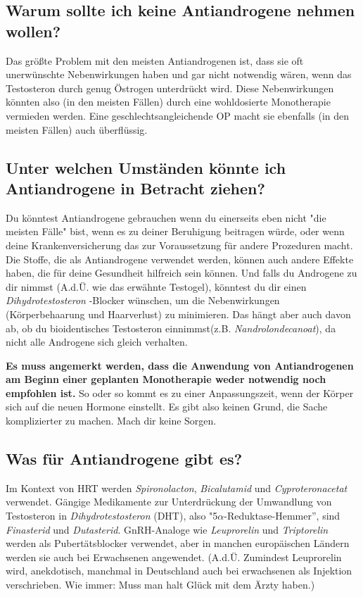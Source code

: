 \documentclass{article}
\begin{document}
\subsection{Warum sollte ich keine Antiandrogene nehmen wollen?}

Das größte Problem mit den meisten Antiandrogenen ist, dass sie oft unerwünschte Nebenwirkungen haben und gar nicht notwendig wären, wenn das Testosteron durch genug Östrogen unterdrückt wird. Diese Nebenwirkungen könnten also (in den meisten Fällen) durch eine wohldosierte Monotherapie vermieden werden. Eine geschlechtsangleichende OP macht sie ebenfalls (in den meisten Fällen) auch überflüssig.

\subsection{Unter welchen Umständen könnte ich Antiandrogene in Betracht ziehen?}

Du könntest Antiandrogene gebrauchen wenn du einerseits eben nicht "die meisten Fälle" bist, wenn es zu deiner Beruhigung beitragen würde, oder wenn deine Krankenversicherung das zur Voraussetzung für andere Prozeduren macht. Die Stoffe, die als Antiandrogene verwendet werden, können auch andere Effekte haben, die für deine Gesundheit hilfreich sein können. Und falls du Androgene zu dir nimmst (A.d.Ü. wie das erwähnte Testogel), könntest du dir einen \textit{Dihydrotestosteron }-Blocker wünschen, um die Nebenwirkungen (Körperbehaarung und Haarverlust) zu minimieren. Das hängt aber auch davon ab, ob du bioidentisches Testosteron einnimmst(z.B. \textit{Nandrolondecanoat}), da nicht alle Androgene sich gleich verhalten.

\textbf{Es muss angemerkt werden, dass die Anwendung von Antiandrogenen am Beginn einer geplanten Monotherapie weder notwendig noch empfohlen ist.} So oder so kommt es zu einer Anpassungszeit, wenn der Körper sich auf die neuen Hormone einstellt. Es gibt also keinen Grund, die Sache komplizierter zu machen. Mach dir keine Sorgen.

\subsection{Was für Antiandrogene gibt es?}

Im Kontext von HRT werden \textit{Spironolacton}, \textit{Bicalutamid} und \textit{Cyproteronacetat} verwendet. Gängige Medikamente zur Unterdrückung der Umwandlung von Testosteron in \textit{Dihydrotestosteron} (DHT), also "5$\alpha$-Reduktase-Hemmer”,  sind \textit{Finasterid} und \textit{Dutasterid}. GnRH-Analoge wie \textit{Leuprorelin} und \textit{Triptorelin} werden als Pubertätsblocker verwendet, aber in manchen europäischen Ländern werden sie auch bei Erwachsenen angewendet. (A.d.Ü. Zumindest Leuprorelin wird, anekdotisch, manchmal in Deutschland auch bei erwachsenen als Injektion verschrieben. Wie immer: Muss man halt Glück mit dem Ärzty haben.)
\end{document}
